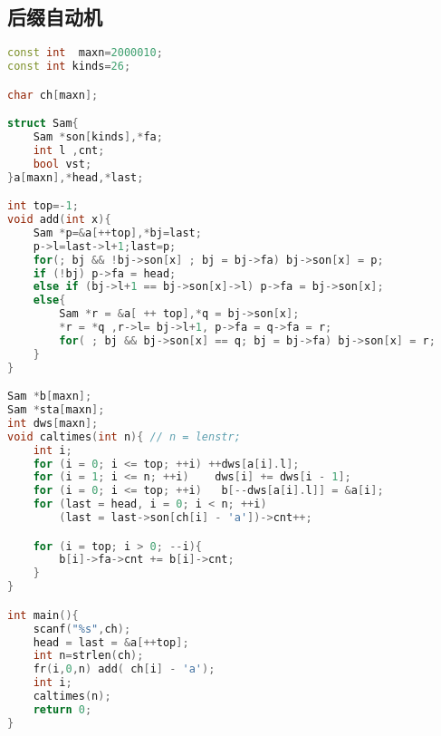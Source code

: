 \subsection{后缀自动机}
		\begin{lstlisting}[language=c++]
const int  maxn=2000010;
const int kinds=26;

char ch[maxn];

struct Sam{
	Sam *son[kinds],*fa;
	int l ,cnt;
	bool vst;
}a[maxn],*head,*last;

int top=-1;
void add(int x){
	Sam *p=&a[++top],*bj=last;
	p->l=last->l+1;last=p;
	for(; bj && !bj->son[x] ; bj = bj->fa) bj->son[x] = p;
	if (!bj) p->fa = head;
	else if (bj->l+1 == bj->son[x]->l) p->fa = bj->son[x];
	else{
		Sam *r = &a[ ++ top],*q = bj->son[x];
		*r = *q ,r->l= bj->l+1, p->fa = q->fa = r;
		for( ; bj && bj->son[x] == q; bj = bj->fa) bj->son[x] = r;
	}
}

Sam *b[maxn];
Sam *sta[maxn];
int dws[maxn];
void caltimes(int n){ // n = lenstr;
	int i;
	for (i = 0; i <= top; ++i) ++dws[a[i].l]; 
	for (i = 1; i <= n; ++i)	dws[i] += dws[i - 1];   
	for (i = 0; i <= top; ++i)   b[--dws[a[i].l]] = &a[i];
	for (last = head, i = 0; i < n; ++i)
		(last = last->son[ch[i] - 'a'])->cnt++;

	for (i = top; i > 0; --i){
		b[i]->fa->cnt += b[i]->cnt;
	}
}

int main(){
	scanf("%s",ch);
	head = last = &a[++top];
	int n=strlen(ch);
	fr(i,0,n) add( ch[i] - 'a');
	int i;
	caltimes(n);
	return 0;
}
		\end{lstlisting}